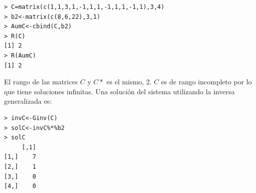 \documentclass[12pt,a4paper]{report}
\begin{document}
\begin{enumerate}
\begin{enumerate}
\begin{verbatim}
> C=matrix(c(1,1,3,1,-1,1,1,-1,1,1,-1,1),3,4)
> b2<-matrix(c(8,6,22),3,1)
> AumC<-cbind(C,b2)
> R(C)
[1] 2
> R(AumC)
[1] 2
\end{verbatim}

El rango de las matrices $C$ y $C*$ es el mismo, 2. $C$ es de rango incompleto por lo que tiene soluciones infinitas.
Una solución del sistema utilizando la inversa generalizada es:
\begin{verbatim}
> invC<-Ginv(C)
> solC<-invC%*%b2
> solC
     [,1]
[1,]    7
[2,]    1
[3,]    0
[4,]    0
\end{verbatim}

\end{enumerate}
\end{enumerate}
\end{document}
